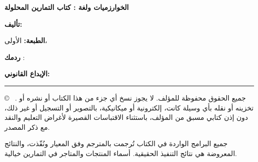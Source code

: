 \thispagestyle{empty}
\null\vfill
\begin{minipage}{\linewidth}
\small\color{brandDark}
{\khatt\bfseries\large الخوارزميات ولغة : كتاب التمارين المحلولة}\par
\vspace{4pt}
\textbf{تأليف:} \teacher\par
\textbf{الطبعة:} الأولى، \par
\textbf{ردمك} : \en{\bookISBN}\par
\textbf{الإيداع القانوني:} \en{\bookDepot}\par
\vspace{8pt}
{\color{brandMuted!60}\rule{\linewidth}{0.4pt}}\par
\vspace{4pt}
\copyright\  \teacher. جميع الحقوق محفوظة للمؤلف.
لا يجوز نسخ أي جزء من هذا الكتاب أو نشره أو تخزينه أو نقله بأي وسيلة كانت،
إلكترونية أو ميكانيكية، بالتصوير أو التسجيل أو غير ذلك، دون إذن كتابي مسبق من المؤلف،
باستثناء الاقتباسات القصيرة لأغراض التعليم والنقد مع ذكر المصدر.\par
\vspace{4pt}
جميع البرامج الواردة في الكتاب تُرجمت بالمترجم  وفق المعيار 
ونُفّذت، والنتائج المعروضة هي نتائج التنفيذ الحقيقية. أسماء المنتجات والمتاجر في التمارين خيالية.
\end{minipage}
\clearpage
